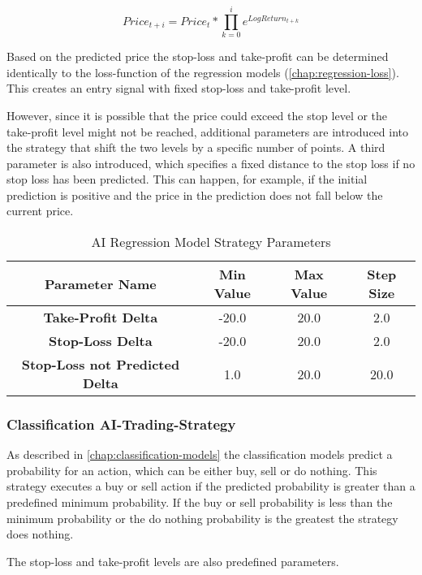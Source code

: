 \[
    Price_{t+i} = Price_t * \prod_{k=0}^{i} e^{LogReturn_{t+k}}
\]

Based on the predicted price the stop-loss and take-profit can be determined identically to the loss-function of the regression models (\autoref{chap:regression-loss}).
This creates an entry signal with fixed stop-loss and take-profit level.

However, since it is possible that the price could exceed the stop level or the take-profit level might not be reached, additional parameters are introduced into the strategy that shift the two levels by a specific number of points.
A third parameter is also introduced, which specifies a fixed distance to the stop loss if no stop loss has been predicted.
This can happen, for example, if the initial prediction is positive and the price in the prediction does not fall below the current price.

\begin{table}[H]
    \centering
    \begin{tabular}{cccc}
        \toprule
        Parameter Name & Min Value & Max Value & Step Size
        \\
        \midrule
        \textbf{Take-Profit Delta}             & -20.0 & 20.0 & 2.0  \\
        \textbf{Stop-Loss Delta}               & -20.0 & 20.0 & 2.0  \\
        \textbf{Stop-Loss not Predicted Delta} & 1.0   & 20.0 & 20.0 \\
        \bottomrule
    \end{tabular}
    \caption{AI Regression Model Strategy Parameters}
    \label{tbl:regression-strategy-parameters}
\end{table}

\subsubsection{Classification AI-Trading-Strategy}

As described in \autoref{chap:classification-models} the classification models predict a probability for an action, which can be either buy, sell or do nothing.
This strategy executes a buy or sell action if the predicted probability is greater than a predefined minimum probability.
If the buy or sell probability is less than the minimum probability or the do nothing probability is the greatest the strategy does nothing.

The stop-loss and take-profit levels are also predefined parameters.

